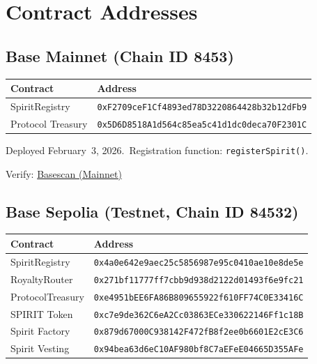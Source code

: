 \documentclass[12pt]{article}
\newcommand{\code}[1]{\texttt{#1}}
\begin{document}
\section{Contract Addresses}
\label{sec:addresses}

\subsection*{Base Mainnet (Chain ID 8453)}

\begin{table}[H]
\centering
\begin{tabular}{@{}ll@{}}
\toprule
\textbf{Contract} & \textbf{Address} \\
\midrule
SpiritRegistry &
\code{0xF2709ceF1Cf4893ed78D3220864428b32b12dFb9} \\
Protocol Treasury &
\code{0x5D6D8518A1d564c85ea5c41d1dc0deca70F2301C} \\
\bottomrule
\end{tabular}
\end{table}

Deployed February~3, 2026.\ Registration function: \code{registerSpirit()}.

Verify: \href{https://basescan.org/address/0xF2709ceF1Cf4893ed78D3220864428b32b12dFb9}{Basescan (Mainnet)}

\subsection*{Base Sepolia (Testnet, Chain ID 84532)}

\begin{table}[H]
\centering
\begin{tabular}{@{}ll@{}}
\toprule
\textbf{Contract} & \textbf{Address} \\
\midrule
SpiritRegistry &
\code{0x4a0e642e9aec25c5856987e95c0410ae10e8de5e} \\
RoyaltyRouter &
\code{0x271bf11777ff7cbb9d938d2122d01493f6e9fc21} \\
ProtocolTreasury &
\code{0xe4951bEE6FA86B809655922f610FF74C0E33416C} \\
SPIRIT Token &
\code{0xc7e9de362C6eA2Cc03863ECe330622146Ff1c18B} \\
Spirit Factory &
\code{0x879d67000C938142F472fB8f2ee0b6601E2cE3C6} \\
Spirit Vesting &
\code{0x94bea63d6eC10AF980bf8C7aEFeE04665D355AFe} \\
\bottomrule
\end{tabular}
\end{table}
\end{document}
